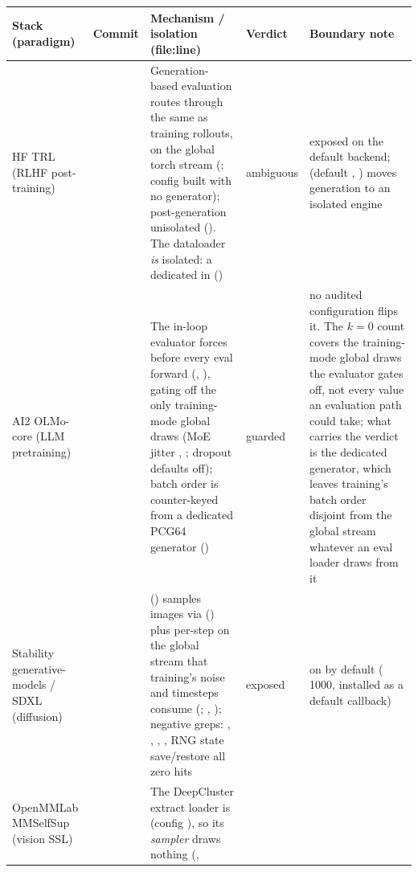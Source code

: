 \begin{table}[tbp]
\centering
\footnotesize
\setlength{\tabcolsep}{4pt}
\begin{tabular}{@{}L{2.0cm}L{1.1cm}L{5.9cm}L{1.6cm}L{3.3cm}@{}}
\toprule
Stack (paradigm) & Commit & Mechanism / isolation (file:line) & Verdict &
Boundary note \\
\midrule
HF TRL (RLHF post-training) &  &
Generation-based evaluation routes through the same
 as training rollouts, on the global
torch stream (; config built 
with no generator); post-generation  unisolated
(). The dataloader \emph{is} isolated: a
dedicated  in 
() &
ambiguous &
exposed on the default backend; 
(default , ) moves generation to
an isolated engine \\
\addlinespace
AI2 OLMo-core (LLM pretraining) &  &
The in-loop evaluator forces  before every eval
forward (, ), gating off the
only training-mode global draws (MoE jitter ,
; dropout defaults off); batch order is counter-keyed from a
dedicated PCG64 generator () &
guarded &
no audited configuration flips it. The $k = 0$ count covers the training-mode
global draws the evaluator gates off, not every value an evaluation path
could take; what carries the verdict is the dedicated generator, which
leaves training's batch order disjoint from the global stream whatever an
eval loader draws from it \\
\addlinespace
Stability generative-models / SDXL (diffusion) &  &
 ()
samples images via  () plus
per-step  on the global stream that training's noise
and timesteps consume (;
, ); negative greps:
, , ,
, RNG state save/restore all zero hits &
exposed &
on by default ( 1000, installed as a default
callback) \\
\addlinespace
OpenMMLab MMSelfSup (vision SSL) &  &
The DeepCluster extract loader is 
(config ), so its \emph{sampler} draws nothing (,

\end{tabular}
\end{table}
